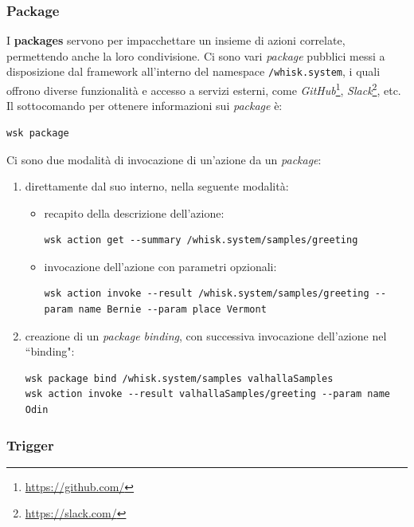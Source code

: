 \documentclass[12pt,a4paper,openany,twoside]{book}
\begin{document}
\subsubsection{Package}

I \textbf{packages} servono per impacchettare un insieme di azioni correlate, permettendo anche la loro condivisione. Ci sono vari \textit{package} pubblici messi a disposizione dal framework all'interno del namespace \texttt{/whisk.system}, i quali offrono diverse funzionalità e accesso a servizi esterni, come \textit{GitHub}\footnote{\url{https://github.com/}}, \textit{Slack}\footnote{\url{https://slack.com/}}, etc.
\newline
Il sottocomando per ottenere informazioni sui \textit{package} è: \begin{lstlisting}
wsk package\end{lstlisting}

\noindent
Ci sono due modalità di invocazione di un'azione da un \textit{package}:
\begin{enumerate}
    \item direttamente dal suo interno, nella seguente modalità:
        \begin{itemize}
            \item recapito della descrizione dell'azione: \begin{lstlisting}
wsk action get --summary /whisk.system/samples/greeting\end{lstlisting}
            \item invocazione dell'azione con parametri opzionali: \begin{lstlisting}
wsk action invoke --result /whisk.system/samples/greeting --param name Bernie --param place Vermont\end{lstlisting}
        \end{itemize}
    
    \item creazione di un \textit{package binding}, con successiva invocazione dell'azione nel ``binding":
    \begin{lstlisting}
wsk package bind /whisk.system/samples valhallaSamples
wsk action invoke --result valhallaSamples/greeting --param name Odin\end{lstlisting}
\end{enumerate}

\subsubsection{Trigger}
\end{document}
